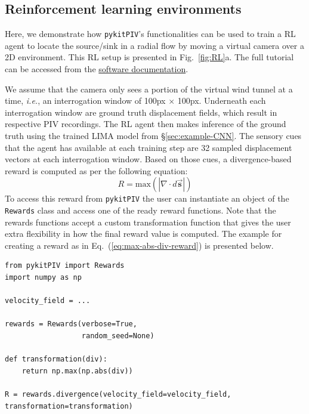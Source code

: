 \documentclass[a4paper,fleqn]{cas-dc}
\begin{document}
\subsection{Reinforcement learning environments} \label{sec:example-RL}

Here, we demonstrate how \texttt{pykitPIV}'s functionalities can be used to train a RL agent to locate the source/sink in a radial flow by moving a virtual camera over a 2D environment. 
This RL setup is presented in Fig.~\ref{fig:RL}a. The full tutorial can be accessed from the \href{https://pykitpiv.readthedocs.com}{software documentation}.

We assume that the camera only sees a portion of the virtual wind tunnel at a time, \textit{i.e.}, an interrogation window of 100px $\times$ 100px. Underneath each interrogation window are ground truth displacement fields, which result in respective PIV recordings. The RL agent then makes inference of the ground truth using the trained LIMA model from \S\ref{sec:example-CNN}. The sensory cues that the agent has available at each training step are 32 sampled displacement vectors at each interrogation window. Based on those cues, a divergence-based reward is computed as per the following equation:
\begin{equation} \label{eq:max-abs-div-reward}
R = \text{max} ( |\nabla \cdot d\vec{\mathbf{s}} | ) 
\end{equation}
To access this reward from \texttt{pykitPIV} the user can instantiate an object of the \texttt{Rewards} class and access one of the ready reward functions. Note that the rewards functions accept a custom transformation function that gives the user extra flexibility in how the final reward value is computed. The example for creating a reward as in Eq.~(\ref{eq:max-abs-div-reward}) is presented below.
\lstset{language=Python}
\begin{lstlisting}
from pykitPIV import Rewards
import numpy as np

velocity_field = ...

rewards = Rewards(verbose=True,
                  random_seed=None)
                  
def transformation(div):
    return np.max(np.abs(div))
    
R = rewards.divergence(velocity_field=velocity_field,
transformation=transformation)
\end{lstlisting}
\end{document}
